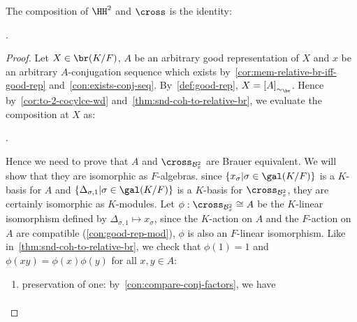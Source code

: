\begin{lemma}\label{lem:relative-br-snd-inverse-2}
  The composition of $\HH^{2}$ and $\cross$ is the identity:
  \begin{center}
    .
  \end{center}
  \leanok
\end{lemma}
\begin{proof}
  Let $X \in \br(K/F)$, $A$ be an arbitrary good representation of $X$ and $x$ be an arbitrary $A$-conjugation sequence which exists by~\cref{cor:mem-relative-br-iff-good-rep} and~\cref{con:exists-conj-seq}. By~\cref{def:good-rep}, $X = \left[A\right]_{\sim_{\br}}$.
  Hence by~\cref{cor:to-2-cocylce-wd} and~\cref{thm:snd-coh-to-relative-br}, we evaluate the composition at $X$ as:
  \begin{center}
    .
  \end{center}
  Hence we need to prove that $A$ and $\cross_{\mathcal{B}^{2}_{x}}$ are Brauer equivalent. We will show that they are isomorphic as $F$-algebras. since $\{x_{\sigma}|\sigma\in\gal(K/F)\}$ is a $K$-basis for $A$ and $\{\Delta_{\sigma, 1}|\sigma \in \gal(K/F)\}$ is a $K$-basis for $\cross_{\mathcal{B}^{2}_{x}}$, they are certainly isomorphic as $K$-modules. Let $\phi : \cross_{\mathcal{B}^{2}_{x}} \cong A$ be the $K$-linear isomorphism defined by $\Delta_{\sigma, 1} \mapsto x_{\sigma}$, since the $K$-action on $A$ and the $F$-action on $A$ are compatible (\cref{con:good-rep-mod}), $\phi$ is also an $F$-linear isomorphism. Like in~\cref{thm:snd-coh-to-relative-br}, we check that $\phi(1) = 1$ and $\phi(xy)=\phi(x)\phi(y)$ for all $x,y \in A$:
  \begin{enumerate}
    \item preservation of one: by~\cref{con:compare-conj-factors}, we have
          \[
          \begin{aligned}

\end{aligned}\]
\end{enumerate}
\end{proof}
